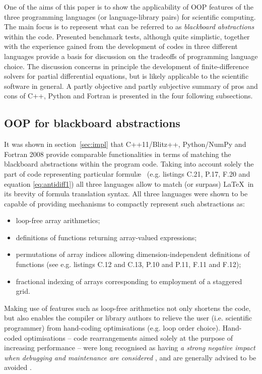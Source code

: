 \documentclass[gmd]{copernicus}%
\begin{document}
  One of the aims of this paper is to show the applicability of OOP features of the three
    programming languages (or language-library pairs) for scientific computing.
  The main focus is to represent
    what can be referred to as {\em blackboard abstractions} \citep{Rouson_et_al_2012} within the code.
  Presented benchmark tests, although quite simplistic, together with the experience gained 
    from the development of codes in three different
    languages provide a basis for discussion on the tradeoffs of programming language choice.
  The discussion concerns in principle the development of finite-difference solvers for 
    partial differential equations, but is likely applicable to the scientific software in general.
  A partly objective and partly subjective summary of pros and cons of C++, Python and Fortran
    is presented in the four following subsections.

  \subsection{OOP for blackboard abstractions}

  It was shown in section~\ref{sec:impl} that C++11/Blitz++, Python/NumPy and Fortran 2008
    provide comparable functionalities in terms of matching the blackboard abstractions
    within the program code.
  Taking into account solely the part of code representing particular formul\ae~
    (e.g. listings C.21, P.17, F.20 and equation \ref{eq:antidiff1}) all three
    languages allow to match (or surpass) \LaTeX~in its brevity of formula translation syntax.
  All three languages were shown to be capable of providing mechanisms to compactly represent such abstractions as:
  \begin{itemize}
    \item{loop-free array arithmetics;}
    \item{definitions of functions returning array-valued expressions;}
    \item{permutations of array indices allowing dimension-independent definitions
      of functions (see e.g. listings C.12 and C.13, P.10 and P.11, F.11 and F.12);}
    \item{fractional indexing of arrays corresponding to employment of a staggered grid.}
  \end{itemize}
  
  Making use of features such as loop-free arithmetics not only shortens the code,
    but also enables the compiler or library authors to relieve the user (i.e. scientific programmer)
    from hand-coding optimisations (e.g. loop order choice).
  Hand-coded optimisations -- code rearrangements aimed solely at the purpose of increasing performance --
    were long recognised as having {\em a strong negative impact when debugging
    and maintenance are considered} \citep{Knuth_1974},
    and are generally advised to be avoided \citep[e.g.][section 3.12]{bib_CERNcpp}.
\end{document}
